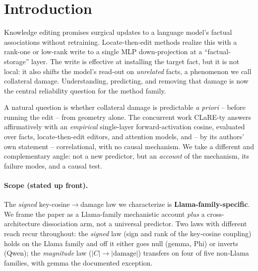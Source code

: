 \section{Introduction}
\label{sec:intro}

Knowledge editing promises surgical updates to a language model's factual
associations without retraining. Locate-then-edit methods
\citep{meng2022rome,meng2023memit} realize this with a rank-one or low-rank
write to a single MLP down-projection at a ``factual-storage'' layer. The
write is effective at installing the target fact, but it is not local: it
also shifts the model's read-out on \emph{unrelated} facts, a phenomenon we
call collateral damage. Understanding, predicting, and removing that damage is
now the central reliability question for the method family.

A natural question is whether collateral damage is predictable
\emph{a priori} -- before running the edit -- from geometry alone. The
concurrent work CLaRE-ty \citep{clarety2026} answers affirmatively with an
\emph{empirical} single-layer forward-activation cosine, evaluated over
\clareNfacts{} facts, \clareNeditors{} locate-then-edit editors, and
\clareNmodels{} attention models, and -- by its authors' own statement --
correlational, with no causal mechanism. We take a different and complementary
angle: not a new predictor, but an \emph{account} of the mechanism, its
failure modes, and a causal test.

\paragraph{Scope (stated up front).} The \emph{signed} key-cosine$\rightarrow$damage
law we characterize is \textbf{Llama-family-specific}. We frame the paper as a
Llama-family mechanistic account \emph{plus} a cross-architecture dissociation
arm, not a universal predictor. Two laws with different reach recur throughout:
the \emph{signed} law (sign and rank of the key-cosine coupling) holds on the
Llama family and off it either goes null (gemma, Phi) or inverts (Qwen); the
\emph{magnitude} law ($|C|\rightarrow|\text{damage}|$) transfers on four of five
non-Llama families, with gemma the documented exception.

